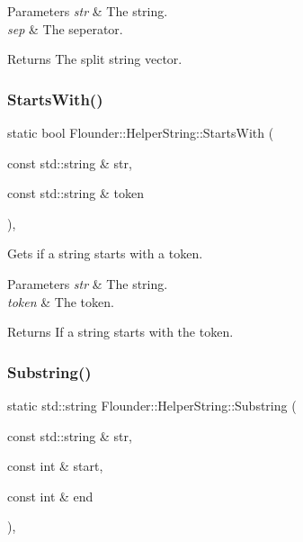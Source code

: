 \begin{DoxyParams}{Parameters}
{\em str} & The string. \\
\hline
{\em sep} & The seperator. \\
\hline
\end{DoxyParams}
\begin{DoxyReturn}{Returns}
The split string vector. 
\end{DoxyReturn}
\mbox{\label{class_flounder_1_1_helper_string_ae6da1f6e0bd955a0b9b6fd82dd2e2fbc}} 
\subsubsection{\texorpdfstring{Starts\+With()}{StartsWith()}}
{\footnotesize\ttfamily static bool Flounder\+::\+Helper\+String\+::\+Starts\+With (\begin{DoxyParamCaption}\item[{const std\+::string \&}]{str,  }\item[{const std\+::string \&}]{token }\end{DoxyParamCaption})\hspace{0.3cm}{\ttfamily [inline]}, {\ttfamily [static]}}



Gets if a string starts with a token. 


\begin{DoxyParams}{Parameters}
{\em str} & The string. \\
\hline
{\em token} & The token. \\
\hline
\end{DoxyParams}
\begin{DoxyReturn}{Returns}
If a string starts with the token. 
\end{DoxyReturn}
\mbox{\label{class_flounder_1_1_helper_string_a3de4b301d88832e0a0123a1aa197d9cd}} 
\subsubsection{\texorpdfstring{Substring()}{Substring()}}
{\footnotesize\ttfamily static std\+::string Flounder\+::\+Helper\+String\+::\+Substring (\begin{DoxyParamCaption}\item[{const std\+::string \&}]{str,  }\item[{const int \&}]{start,  }\item[{const int \&}]{end }\end{DoxyParamCaption})\hspace{0.3cm}{\ttfamily [inline]}, {\ttfamily [static]}}



